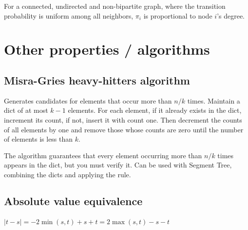 For a connected, undirected and non-bipartite graph, where the transition probability is uniform among all neighbors, $\pi_i$ is proportional to node $i$'s degree.



\section{Other properties / algorithms}

\subsection{Misra-Gries heavy-hitters algorithm}
Generates candidates for elements that occur more than $n/k$ times. Maintain a dict of at most $k-1$ elements. For each element, if it already exists in the dict, increment its count, if not, insert it with count one. Then decrement the counts of all elements by one and remove those whose counts are zero until the number of elements is less than $k$.

The algorithm guarantees that every element occurring more than $n/k$ times appears in the dict, but you must verify it. Can be used with Segment Tree, combining the dicts and applying the rule.

\subsection{Absolute value equivalence}
$|t-s| = -2\min(s,t) + s + t = 2\max(s,t) - s - t$

